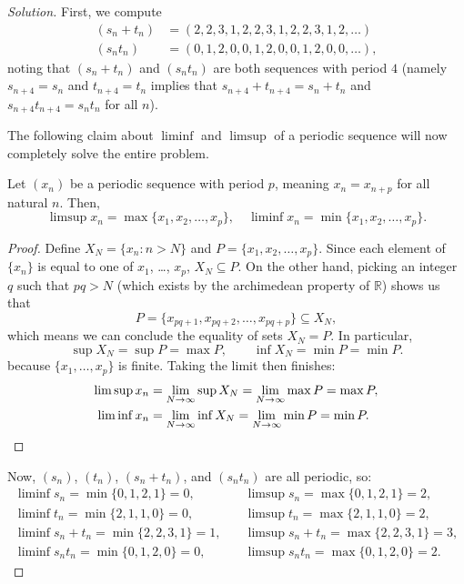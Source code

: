\documentclass[11pt]{scrartcl}
\providecommand{\RR}{\mathbb R}
\theoremstyle{problem}
\theoremstyle{remark}
\newenvironment{soln}{\begin{proof}[Solution]}{\end{proof}}
\begin{document}
\begin{soln}
	First, we compute
	\begin{align*}
		(s_n+t_n) &= (2, 2, 3, 1, 2, 2, 3, 1, 2, 2, 3, 1, 2, \dots)\\
		(s_nt_n)  &= (0, 1, 2, 0, 0, 1, 2, 0, 0, 1, 2, 0, 0, \dots),
	\end{align*}
	noting that $(s_n+t_n)$ and $(s_nt_n)$ are both sequences with period $4$
	(namely $s_{n+4} = s_n$ and $t_{n+4} = t_n$ implies that
	$s_{n+4} + t_{n+4} = s_n + t_n$ and $s_{n+4}t_{n+4} = s_nt_n$
	for all $n$).
	
	The following claim about $\liminf$ and $\limsup$ of a periodic sequence
	will now completely solve the entire problem.
	\begin{claim*}
		Let $(x_n)$ be a periodic sequence with period $p$, meaning
		$x_n = x_{n+p}$ for all natural $n$. Then,
		\[\limsup x_n = \max\{x_1, x_2, \dots, x_p\},\quad
		\liminf x_n = \min\{x_1, x_2, \dots, x_p\}.\]
	\end{claim*}
	\begin{proof}
		Define $X_N = \{x_n : n > N\}$ and $P = \{x_1, x_2, \dots, x_p\}$.
		Since each element of $\{x_n\}$ is equal to one of $x_1$, \dots, $x_p$,
		$X_N\subseteq P$. On the other hand,
		picking an integer $q$ such that $pq > N$
		(which exists by the archimedean property of $\RR$)
		shows us that
		\[P = \{x_{pq + 1}, x_{pq + 2}, \dots, x_{pq + p}\} \subseteq X_N,\]
		which means we can conclude the equality of sets
		$X_N = P$.
		In particular,
		\[
		\sup X_N = \sup P = \max P,\qquad
		\inf X_N = \min P = \min P.
		\]
		because $\{x_1, \dots, x_p\}$ is finite.
		Taking the limit then finishes:
		\begin{align*}
			\limsup x_n &= \lim_{N\to\infty}\sup X_N
			= \lim_{N\to\infty} \max P = \max P,\\
			\liminf x_n &= \lim_{N\to\infty}\inf X_N
			= \lim_{N\to\infty} \min P = \min P.
			\qedhere
		\end{align*}
	\end{proof}
	
	Now, $(s_n)$, $(t_n)$, $(s_n + t_n)$, and $(s_nt_n)$ are all periodic, so:
	\begin{align*}
		\liminf s_n = \min\{0, 1, 2, 1\} = 0,\quad&
		\limsup s_n = \max\{0, 1, 2, 1\} = 2,\\
		\liminf t_n = \min\{2, 1, 1, 0\} = 0,\quad&
		\limsup t_n = \max\{2, 1, 1, 0\} = 2,\\
		\liminf s_n+t_n = \min\{2, 2, 3, 1\} = 1,\quad&
		\limsup s_n+t_n = \max\{2, 2, 3, 1\} = 3,\\
		\liminf s_nt_n = \min\{0, 1, 2, 0\} = 0,\quad&
		\limsup s_nt_n = \max\{0, 1, 2, 0\} = 2.
	\end{align*}
	

\end{soln}
\end{document}
